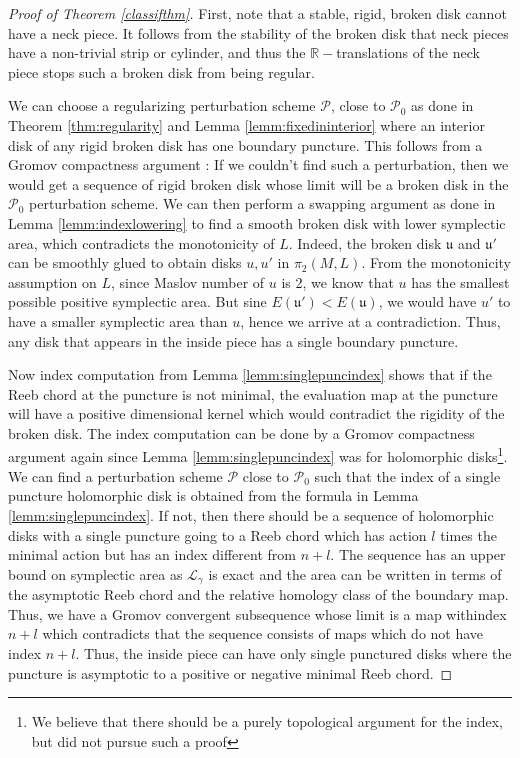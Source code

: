 \documentclass[11pt, oneside,dvipsnames]{amsart}
\newcommand{\<}{\langle}
\renewcommand{\>}{\rangle}
\newcommand{\bR}{\mathbb{R}}
\newcommand{\cL}{\mathcal{L}}
\newcommand{\cP}{\mathcal{P}}
\newcommand{\fu}{\mathfrak{u}}
\theoremstyle{definition}
\theoremstyle{definition}
\numberwithin{equation}{subsection}
\begin{document}
\begin{proof}[Proof of Theorem \ref{classifthm}]
First, note that a stable, rigid, broken disk cannot have a neck piece. It follows from the stability of the broken disk that neck pieces have a non-trivial strip or cylinder, and thus the $\bR-$translations of the neck piece stops such a broken disk from being regular. 

   
    We can choose a regularizing perturbation scheme $\cP$, close to $\cP_0$ as done in Theorem \ref{thm:regularity} and Lemma \ref{lemm:fixedininterior} where an interior disk of any rigid broken disk has one boundary puncture. This follows from a Gromov compactness argument : If we couldn't find such a perturbation, then we would get a sequence of rigid broken disk whose limit will be a broken disk in the $\cP_0$ perturbation scheme. We can then perform a swapping argument as done in Lemma \ref{lemm:indexlowering} to find a smooth broken disk with lower symplectic area, which contradicts the monotonicity of $L$. Indeed, the broken disk $\fu$ and $\fu'$ can be smoothly glued to obtain disks $u,u'$ in $\pi_2(M,L)$. From the monotonicity assumption on $L$, since Maslov number of $u$ is 2, we know that $u$ has the smallest possible positive symplectic area. But sine $E(\fu') < E(\fu)$, we would have $u'$ to have a smaller symplectic area than $u$, hence we arrive at a contradiction. Thus, any disk that appears in the inside piece has a single boundary puncture. 
    
    Now index computation from Lemma \ref{lemm:singlepuncindex} shows that if the Reeb chord at the puncture is not minimal, the evaluation map at the puncture will have a positive dimensional kernel which would contradict the rigidity of the broken disk. The index computation can be done by a Gromov compactness argument again since Lemma \ref{lemm:singlepuncindex} was for holomorphic disks\footnote{We believe that there should be a purely topological argument for the index, but did not pursue such a proof}. We can find a perturbation scheme $\cP$ close to $\cP_0$ such that the index of a single puncture holomorphic disk is obtained from the formula in Lemma \ref{lemm:singlepuncindex}. If not, then there should be a sequence of holomorphic disks with a single puncture going to a Reeb chord which has action $l$ times the minimal action but has an index different from $n+l$. The sequence has an upper bound on symplectic area as $\cL_\gamma$ is exact and the area can be written in terms of the asymptotic Reeb chord and the relative homology class of the boundary map. Thus, we have a Gromov convergent subsequence whose limit is a map withindex $n+l$ which contradicts that the sequence consists of maps which do not have index $n+l$.  Thus, the inside piece can have only single punctured disks where the puncture is asymptotic to a positive or negative minimal Reeb chord.



\end{proof}
\end{document}
